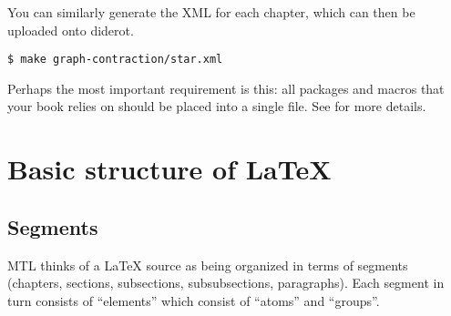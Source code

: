 You can similarly generate the XML for each chapter, which can then be uploaded onto diderot.
\begin{lstlisting}
$ make graph-contraction/star.xml
\end{lstlisting}

Perhaps the most important requirement is this: all packages and macros that your book relies on should be placed into a single  file.  See  for more details.


\section{Basic structure of LaTeX} 


\subsection{Segments}

MTL thinks of a LaTeX source as being organized in terms of segments (chapters, sections, subsections, subsubsections, paragraphs).  Each segment in turn consists of ``elements'' which consist of ``atoms'' and ``groups''.

